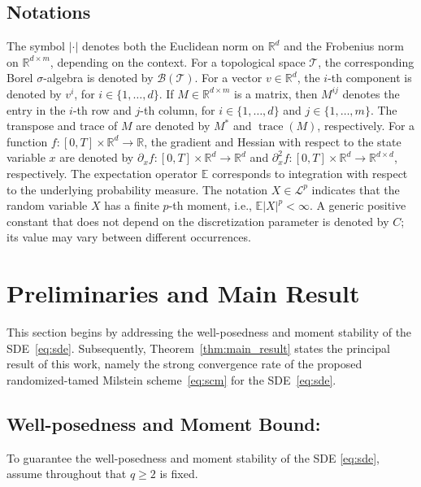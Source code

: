 \documentclass[reqno,  oneside, 12pt]{amsart}
\begin{document}
\subsection*{Notations} 
The symbol \( |\cdot| \) denotes both the Euclidean norm on \( \mathbb{R}^d \) and the Frobenius norm on \( \mathbb{R}^{d \times m} \), depending on the context. For a topological space \( \mathcal{T} \), the corresponding Borel \(\sigma\)-algebra is denoted by \( \mathscr{B}(\mathcal{T}) \).
For a vector \( v \in \mathbb{R}^d \), the \( i \)-th component is denoted by \( v^i \), for \( i \in \{1, \dots, d\} \). If \( M \in \mathbb{R}^{d \times m} \) is a matrix, then \( M^{ij} \) denotes the entry in the \( i \)-th row and \( j \)-th column, for \( i \in \{1, \dots, d\} \) and \( j \in \{1, \dots, m\} \). The transpose and trace of \( M \) are denoted by \( M^* \) and \( \operatorname{trace}(M) \), respectively.
For a function \( f : [0,T] \times \mathbb{R}^d \to \mathbb{R} \), the gradient and Hessian with respect to the state variable \( x \) are denoted by
\(\partial_x f : [0,T] \times \mathbb{R}^d \to \mathbb{R}^d\)  
and \(\partial_x^2 f : [0,T] \times \mathbb{R}^d \to \mathbb{R}^{d \times d}\), respectively.
The expectation operator \( \mathbb{E} \) corresponds to integration with respect to the underlying probability measure. The notation \( X \in \mathscr{L}^p \) indicates that the random variable \( X \) has a finite \( p \)-th moment, i.e.,
\(
\mathbb{E}|X|^p < \infty.
\)
A generic positive constant that does not depend on the discretization parameter is denoted by \( C \); its value may vary between different occurrences.




\section{Preliminaries and Main Result}  %
This section begins by addressing the well-posedness and moment stability of the SDE~\eqref{eq:sde}. Subsequently, Theorem~\ref{thm:main_result} states the principal result of this work, namely the strong convergence rate of the proposed randomized-tamed Milstein scheme~\eqref{eq:scm} for the SDE~\eqref{eq:sde}. 


\subsection*{Well-posedness and Moment Bound:}
To guarantee the well-posedness and moment stability of the SDE \eqref{eq:sde}, assume throughout that $q \geq 2$ is fixed.
\end{document}
